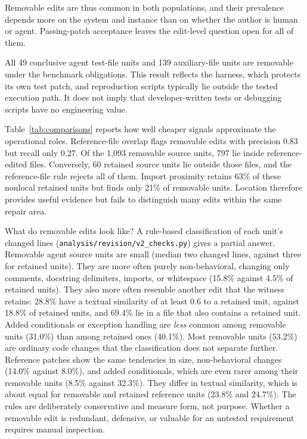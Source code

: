 \documentclass[a4paper,fleqn]{cas-sc}
\begin{document}
Removable edits are thus common in both populations, and their prevalence depends more on the system and instance than on whether the author is human or agent. Passing-patch acceptance leaves the edit-level question open for all of them.

All 49 conclusive agent test-file units and 139 auxiliary-file units are removable under the benchmark obligations. This result reflects the harness, which protects its own test patch, and reproduction scripts typically lie outside the tested execution path. It does not imply that developer-written tests or debugging scripts have no engineering value.

Table~\ref{tab:comparisons} reports how well cheaper signals approximate the operational roles. Reference-file overlap flags removable edits with precision 0.83 but recall only 0.27. Of the 1,093 removable source units, 797 lie inside reference-edited files. Conversely, 60 retained source units lie outside those files, and the reference-file rule rejects all of them. Import proximity retains 63\% of these nonlocal retained units but finds only 21\% of removable units. Location therefore provides useful evidence but fails to distinguish many edits within the same repair area.

What do removable edits look like? A rule-based classification of each unit's changed lines (\nolinkurl{analysis/revision/v2_checks.py}) gives a partial answer. Removable agent source units are small (median two changed lines, against three for retained units). They are more often purely non-behavioral, changing only comments, docstring delimiters, imports, or whitespace (15.8\% against 4.5\% of retained units). They also more often resemble another edit that the witness retains: 28.8\% have a textual similarity of at least 0.6 to a retained unit, against 18.8\% of retained units, and 69.4\% lie in a file that also contains a retained unit. Added conditionals or exception handling are \emph{less} common among removable units (31.0\%) than among retained ones (40.1\%). Most removable units (53.2\%) are ordinary code changes that the classification does not separate further. Reference patches show the same tendencies in size, non-behavioral changes (14.0\% against 8.0\%), and added conditionals, which are even rarer among their removable units (8.5\% against 32.3\%). They differ in textual similarity, which is about equal for removable and retained reference units (23.8\% and 24.7\%). The rules are deliberately conservative and measure form, not purpose. Whether a removable edit is redundant, defensive, or valuable for an untested requirement requires manual inspection.
\end{document}

